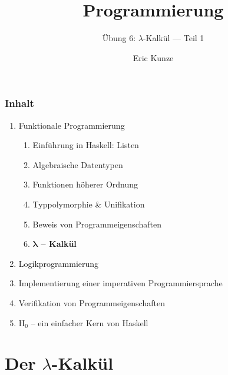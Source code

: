 \documentclass{beamer}
\begin{document}
	
	\title{Programmierung}
	\subtitle{Übung 6: $\lambda$-Kalkül --- Teil 1}
	\author{Eric Kunze}
	\date{}
	
	\maketitle
	


\begin{frame}[fragile] \frametitle{Inhalt}
	\begin{enumerate}
		\item Funktionale Programmierung
		\begin{enumerate}
			\item Einführung in Haskell: Listen
			\item Algebraische Datentypen
			\item Funktionen höherer Ordnung
			\item Typpolymorphie \& Unifikation
			\item Beweis von Programmeigenschaften
			\item \textbf{$\bm\lambda$ -- Kalkül}
		\end{enumerate}
		\item Logikprogrammierung
		\item Implementierung einer imperativen Programmiersprache
		\item Verifikation von Programmeigenschaften
		\item H${}_\text{0}$ -- ein einfacher Kern von Haskell
	\end{enumerate}
\end{frame}

\section{Der $\lambda$-Kalkül}
\end{document}
